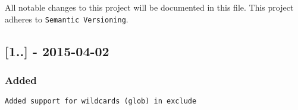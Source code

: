 All notable changes to this project will be documented in this file. This project adheres to {\tt Semantic Versioning}.

\subsection*{[1..] -\/ 2015-\/04-\/02}

\subsubsection*{Added}


\begin{DoxyItemize}
\item {\tt Added support for wildcards (glob) in exclude} 
\end{DoxyItemize}